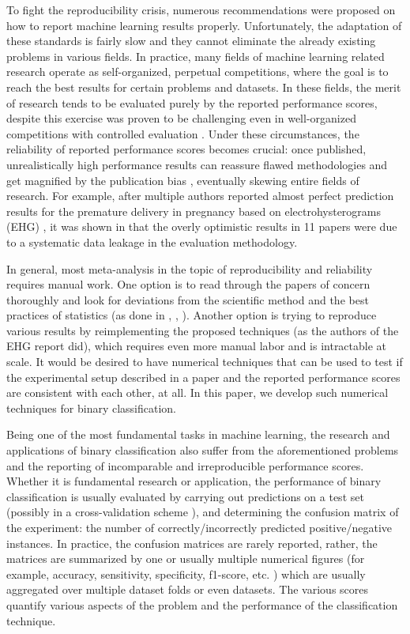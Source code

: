 \documentclass[5p, final]{elsarticle}
\begin{document}
To fight the reproducibility crisis, numerous recommendations were proposed \cite{repr0, repr2} on how to report machine learning results properly. Unfortunately, the adaptation of these standards is fairly slow and they cannot eliminate the already existing problems in various fields. 
In practice, many fields of machine learning related research operate as self-organized, perpetual competitions, where the goal is to reach the best results for certain problems and datasets. In these fields, the merit of research tends to be evaluated purely by the reported performance scores, despite this exercise was proven to be challenging even in well-organized competitions with controlled evaluation \cite{ranking}. Under these circumstances, the reliability of reported performance scores becomes crucial: once published, unrealistically high performance results can reassure flawed methodologies and get magnified by the publication bias \cite{publicationbias}, eventually skewing entire fields of research. For example, after multiple authors reported almost perfect prediction results for the premature delivery in pregnancy based on electrohysterograms (EHG) \cite{ehgreview}, it was shown in \cite{ehg} that the overly optimistic results in 11 papers were due to a systematic data leakage in the evaluation methodology.

In general, most meta-analysis \cite{metaresearch} in the topic of reproducibility and reliability requires manual work. One option is to read through the papers of concern thoroughly and look for deviations from the scientific method and the best practices of statistics (as done in \cite{psychiatry}, \cite{csecurity}, \cite{satellite}). Another option is trying to reproduce various results by reimplementing the proposed techniques (as the authors of the EHG report \cite{ehg} did), which requires even more manual labor and is intractable at scale. It would be desired to have numerical techniques that can be used to test if the experimental setup described in a paper and the reported performance scores are consistent with each other, at all. In this paper, we develop such numerical techniques for binary classification.

Being one of the most fundamental tasks in machine learning, the research and applications of binary classification \cite{1} also suffer from the aforementioned problems and the reporting of incomparable and irreproducible performance scores. Whether it is fundamental research or application, the performance of binary classification is usually evaluated by carrying out predictions on a test set (possibly in a cross-validation scheme \cite{cv1}), and determining the confusion matrix \cite{scores} of the experiment: the number of correctly/incorrectly predicted positive/negative instances. In practice, the confusion matrices are rarely reported, rather, the matrices are summarized by one or usually multiple numerical figures (for example, accuracy, sensitivity, specificity, f1-score, etc. \cite{scores}) which are usually aggregated over multiple dataset folds or even datasets. The various scores quantify various aspects of the problem and the performance of the classification technique. 
\end{document}
